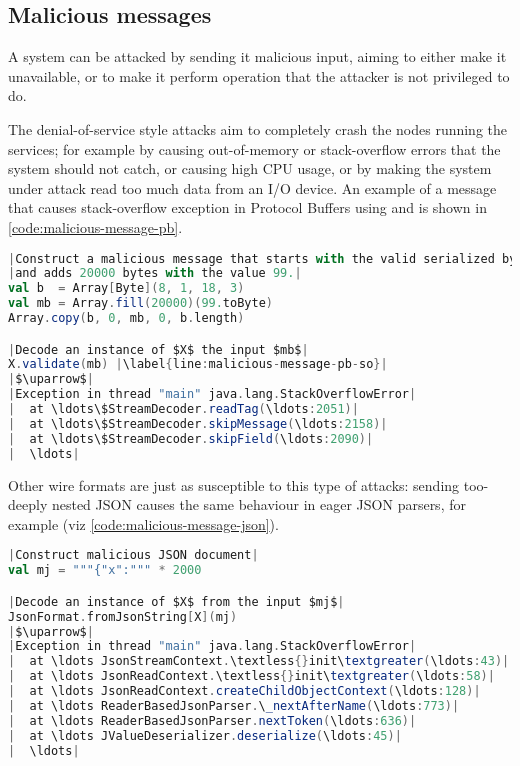 
\subsection{Malicious messages}
A system can be attacked by sending it malicious input, aiming to either make it unavailable, or to make it perform operation that the attacker is not privileged to do. 

The denial-of-service style attacks aim to completely crash the nodes running the services; for example by causing out-of-memory or stack-overflow errors that the system should not catch, or causing high CPU usage, or by making the system under attack read too much data from an I/O device. An example of a message that causes stack-overflow exception in Protocol Buffers using  and \cite{scalapb} is shown in \autoref{code:malicious-message-pb}.

\begin{lstlisting}[caption={Malicious message}, label={code:malicious-message-pb}, language=Scala, escapechar=|]
|Construct a malicious message that starts with the valid serialized bytes $b$|
|and adds 20000 bytes with the value 99.|
val b  = Array[Byte](8, 1, 18, 3)
val mb = Array.fill(20000)(99.toByte)
Array.copy(b, 0, mb, 0, b.length)

|Decode an instance of $X$ the input $mb$|
X.validate(mb) |\label{line:malicious-message-pb-so}|
|$\uparrow$|
|Exception in thread "main" java.lang.StackOverflowError|
|  at \ldots\$StreamDecoder.readTag(\ldots:2051)|
|  at \ldots\$StreamDecoder.skipMessage(\ldots:2158)|
|  at \ldots\$StreamDecoder.skipField(\ldots:2090)|
|  \ldots|
\end{lstlisting}

Other wire formats are just as susceptible to this type of attacks: sending too-deeply nested JSON causes the same behaviour in eager JSON parsers, for example  (viz \autoref{code:malicious-message-json}).

\begin{lstlisting}[caption={Malicious message}, label={code:malicious-message-json}, language=Scala, escapechar=|]
|Construct malicious JSON document|
val mj = """{"x":""" * 2000

|Decode an instance of $X$ from the input $mj$|
JsonFormat.fromJsonString[X](mj)
|$\uparrow$|
|Exception in thread "main" java.lang.StackOverflowError|
|  at \ldots JsonStreamContext.\textless{}init\textgreater(\ldots:43)|
|  at \ldots JsonReadContext.\textless{}init\textgreater(\ldots:58)|
|  at \ldots JsonReadContext.createChildObjectContext(\ldots:128)|
|  at \ldots ReaderBasedJsonParser.\_nextAfterName(\ldots:773)|
|  at \ldots ReaderBasedJsonParser.nextToken(\ldots:636)|
|  at \ldots JValueDeserializer.deserialize(\ldots:45)|
|  \ldots|
\end{lstlisting}


